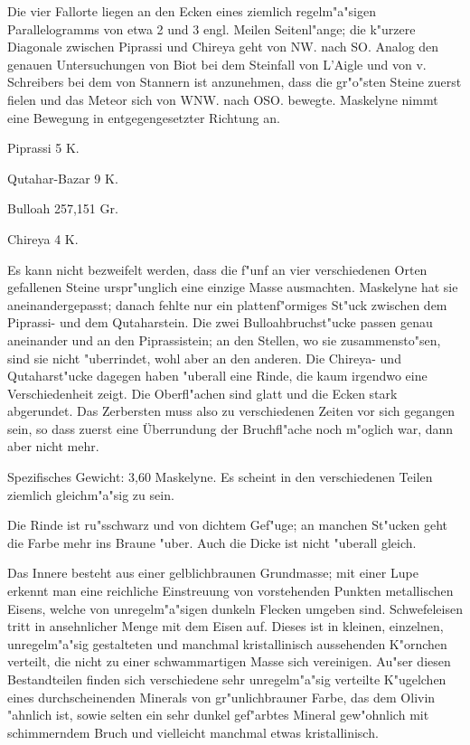 \documentclass[a4paper, 11pt, oneside]{article}
\begin{document}
Die vier Fallorte liegen an den Ecken eines ziemlich regelm"a"sigen Parallelogramms von etwa 2 und 3 engl. Meilen Seitenl"ange; die k"urzere Diagonale zwischen Piprassi und Chireya geht von NW. nach SO. Analog den genauen Untersuchungen von Biot bei dem Steinfall von L'Aigle und von v. Schreibers bei dem von Stannern ist anzunehmen, dass die gr"o"sten Steine zuerst fielen und das Meteor sich von WNW. nach OSO. bewegte. Maskelyne nimmt eine Bewegung in entgegengesetzter Richtung an.

Piprassi  
5 K.

Qutahar-Bazar  
9 K.

Bulloah  
257,151 Gr.

Chireya  
4 K.

Es kann nicht bezweifelt werden, dass die f"unf an vier verschiedenen Orten gefallenen Steine urspr"unglich eine einzige Masse ausmachten. Maskelyne hat sie aneinandergepasst; danach fehlte nur ein plattenf"ormiges St"uck zwischen dem Piprassi- und dem Qutaharstein. Die zwei Bulloahbruchst"ucke passen genau aneinander und an den Piprassistein; an den Stellen, wo sie zusammensto"sen, sind sie nicht "uberrindet, wohl aber an den anderen. Die Chireya- und Qutaharst"ucke dagegen haben "uberall eine Rinde, die kaum irgendwo eine Verschiedenheit zeigt. Die Oberfl"achen sind glatt und die Ecken stark abgerundet. Das Zerbersten muss also zu verschiedenen Zeiten vor sich gegangen sein, so dass zuerst eine Überrundung der Bruchfl"ache noch m"oglich war, dann aber nicht mehr.

Spezifisches Gewicht: 3,60 Maskelyne. Es scheint in den verschiedenen Teilen ziemlich gleichm"a"sig zu sein.

Die Rinde ist ru"sschwarz und von dichtem Gef"uge; an manchen St"ucken geht die Farbe mehr ins Braune "uber. Auch die Dicke ist nicht "uberall gleich.

Das Innere besteht aus einer gelblichbraunen Grundmasse; mit einer Lupe erkennt man eine reichliche Einstreuung von vorstehenden Punkten metallischen Eisens, welche von unregelm"a"sigen dunkeln Flecken umgeben sind. Schwefeleisen tritt in ansehnlicher Menge mit dem Eisen auf. Dieses ist in kleinen, einzelnen, unregelm"a"sig gestalteten und manchmal kristallinisch aussehenden K"ornchen verteilt, die nicht zu einer schwammartigen Masse sich vereinigen. Au"ser diesen Bestandteilen finden sich verschiedene sehr unregelm"a"sig verteilte K"ugelchen eines durchscheinenden Minerals von gr"unlichbrauner Farbe, das dem Olivin "ahnlich ist, sowie selten ein sehr dunkel gef"arbtes Mineral gew"ohnlich mit schimmerndem Bruch und vielleicht manchmal etwas kristallinisch.
\end{document}
